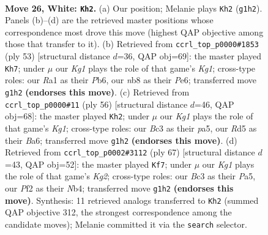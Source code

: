 \documentclass[11pt]{article}
\begin{document}
\clearpage

\begin{figure}[p]\centering
\begin{subfigure}{0.46\textwidth}\centering
\resizebox{\linewidth}{!}{%
\newchessgame
\chessboard[
  setfen={rn2k3/p7/8/3R1pr1/1P6/2B5/P3bP2/R5K1 w q - 0 26},
  showmover=false,
  pgfstyle=straightmove, color=movearrow, markmove={g1-h2}
]}
\caption{}
\end{subfigure}\hfill
\begin{subfigure}{0.46\textwidth}\centering
\resizebox{\linewidth}{!}{%
\newchessgame
\chessboard[
  setfen={2R3k1/6p1/1p2p3/4r3/4N3/7P/rbP3P1/1R4K1 b - - 2 27},
  showmover=false,
  pgfstyle=straightmove, color=movearrow, markmove={g8-h7}
]}
\caption{}
\end{subfigure}
\\[4pt]
\begin{subfigure}{0.46\textwidth}\centering
\resizebox{\linewidth}{!}{%
\newchessgame
\chessboard[
  setfen={1r4k1/2R2R2/B7/p5rp/8/7b/1P3P2/6K1 w - - 1 29},
  showmover=false,
  pgfstyle=straightmove, color=movearrow, markmove={g1-h2}
]}
\caption{}
\end{subfigure}\hfill
\begin{subfigure}{0.46\textwidth}\centering
\resizebox{\linewidth}{!}{%
\newchessgame
\chessboard[
  setfen={3rr3/p3p1k1/8/p2P2R1/1n4N1/8/1P3K2/3R4 b - - 0 34},
  showmover=false,
  pgfstyle=straightmove, color=movearrow, markmove={g7-f7}
]}
\caption{}
\end{subfigure}
\caption{\textbf{Move 26, White: \texttt{Kh2}.} (a) Our position; Melanie plays \texttt{Kh2} (\texttt{g1h2}). Panels (b)--(d) are the retrieved master positions whose correspondence most drove this move (highest QAP objective among those that transfer to it). (b) Retrieved from \texttt{ccrl\_top\_p0000\#1853} (ply 53) [structural distance $d$=36, QAP obj=69]: the master played \texttt{Kh7}; under $\mu$ our \emph{Kg1} plays the role of that game's \emph{Kg1}; cross-type roles: our \emph{R}a1 as their \emph{P}b6, our \emph{n}b8 as their \emph{P}e6; transferred move \texttt{g1h2} \textbf{(endorses this move)}. (c) Retrieved from \texttt{ccrl\_top\_p0000\#11} (ply 56) [structural distance $d$=46, QAP obj=68]: the master played \texttt{Kh2}; under $\mu$ our \emph{Kg1} plays the role of that game's \emph{Kg1}; cross-type roles: our \emph{B}c3 as their \emph{p}a5, our \emph{R}d5 as their \emph{B}a6; transferred move \texttt{g1h2} \textbf{(endorses this move)}. (d) Retrieved from \texttt{ccrl\_top\_p0002\#3112} (ply 67) [structural distance $d$=43, QAP obj=52]: the master played \texttt{Kf7}; under $\mu$ our \emph{Kg1} plays the role of that game's \emph{Kg2}; cross-type roles: our \emph{B}c3 as their \emph{P}a5, our \emph{P}f2 as their \emph{N}b4; transferred move \texttt{g1h2} \textbf{(endorses this move)}. Synthesis: 11 retrieved analogs transferred to \texttt{Kh2} (summed QAP objective 312, the strongest correspondence among the candidate moves); Melanie committed it via the \texttt{search} selector.}
\label{fig:thought-m50}
\end{figure}
\end{document}
